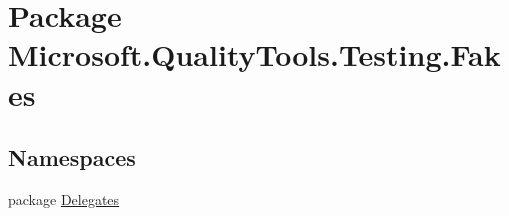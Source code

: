 \hypertarget{namespace_microsoft_1_1_quality_tools_1_1_testing_1_1_fakes}{\section{Package Microsoft.\-Quality\-Tools.\-Testing.\-Fakes}
\label{namespace_microsoft_1_1_quality_tools_1_1_testing_1_1_fakes}
}
\subsection*{Namespaces}
\begin{DoxyCompactItemize}
\item 
package \hyperlink{namespace_microsoft_1_1_quality_tools_1_1_testing_1_1_fakes_1_1_delegates}{Delegates}
\end{DoxyCompactItemize}
